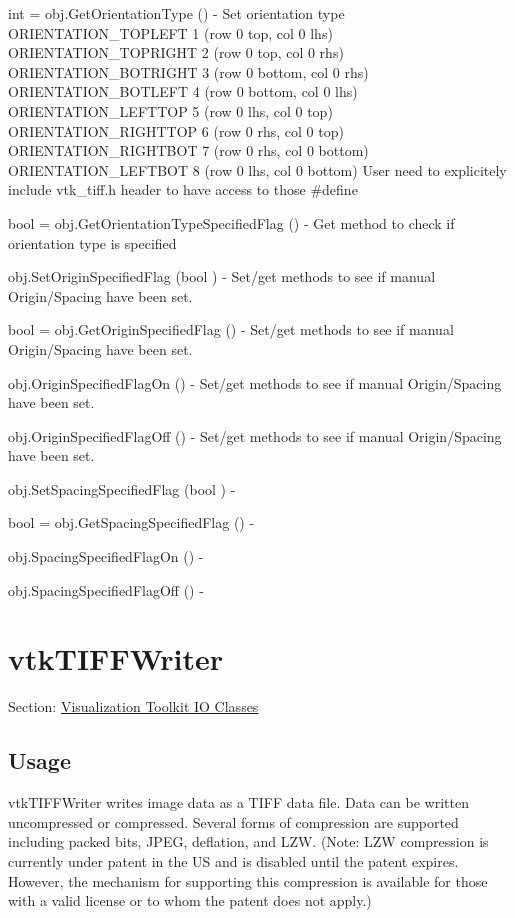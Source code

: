 \begin{DoxyItemize}
\item {\ttfamily int = obj.\-Get\-Orientation\-Type ()} -\/ Set orientation type O\-R\-I\-E\-N\-T\-A\-T\-I\-O\-N\-\_\-\-T\-O\-P\-L\-E\-F\-T 1 (row 0 top, col 0 lhs) O\-R\-I\-E\-N\-T\-A\-T\-I\-O\-N\-\_\-\-T\-O\-P\-R\-I\-G\-H\-T 2 (row 0 top, col 0 rhs) O\-R\-I\-E\-N\-T\-A\-T\-I\-O\-N\-\_\-\-B\-O\-T\-R\-I\-G\-H\-T 3 (row 0 bottom, col 0 rhs) O\-R\-I\-E\-N\-T\-A\-T\-I\-O\-N\-\_\-\-B\-O\-T\-L\-E\-F\-T 4 (row 0 bottom, col 0 lhs) O\-R\-I\-E\-N\-T\-A\-T\-I\-O\-N\-\_\-\-L\-E\-F\-T\-T\-O\-P 5 (row 0 lhs, col 0 top) O\-R\-I\-E\-N\-T\-A\-T\-I\-O\-N\-\_\-\-R\-I\-G\-H\-T\-T\-O\-P 6 (row 0 rhs, col 0 top) O\-R\-I\-E\-N\-T\-A\-T\-I\-O\-N\-\_\-\-R\-I\-G\-H\-T\-B\-O\-T 7 (row 0 rhs, col 0 bottom) O\-R\-I\-E\-N\-T\-A\-T\-I\-O\-N\-\_\-\-L\-E\-F\-T\-B\-O\-T 8 (row 0 lhs, col 0 bottom) User need to explicitely include vtk\-\_\-tiff.\-h header to have access to those \#define  
\item {\ttfamily bool = obj.\-Get\-Orientation\-Type\-Specified\-Flag ()} -\/ Get method to check if orientation type is specified  
\item {\ttfamily obj.\-Set\-Origin\-Specified\-Flag (bool )} -\/ Set/get methods to see if manual Origin/\-Spacing have been set.  
\item {\ttfamily bool = obj.\-Get\-Origin\-Specified\-Flag ()} -\/ Set/get methods to see if manual Origin/\-Spacing have been set.  
\item {\ttfamily obj.\-Origin\-Specified\-Flag\-On ()} -\/ Set/get methods to see if manual Origin/\-Spacing have been set.  
\item {\ttfamily obj.\-Origin\-Specified\-Flag\-Off ()} -\/ Set/get methods to see if manual Origin/\-Spacing have been set.  
\item {\ttfamily obj.\-Set\-Spacing\-Specified\-Flag (bool )} -\/  
\item {\ttfamily bool = obj.\-Get\-Spacing\-Specified\-Flag ()} -\/  
\item {\ttfamily obj.\-Spacing\-Specified\-Flag\-On ()} -\/  
\item {\ttfamily obj.\-Spacing\-Specified\-Flag\-Off ()} -\/  
\end{DoxyItemize}\hypertarget{vtkio_vtktiffwriter}{}\section{vtk\-T\-I\-F\-F\-Writer}\label{vtkio_vtktiffwriter}
Section\-: \hyperlink{sec_vtkio}{Visualization Toolkit I\-O Classes} \hypertarget{vtkwidgets_vtkxyplotwidget_Usage}{}\subsection{Usage}\label{vtkwidgets_vtkxyplotwidget_Usage}
vtk\-T\-I\-F\-F\-Writer writes image data as a T\-I\-F\-F data file. Data can be written uncompressed or compressed. Several forms of compression are supported including packed bits, J\-P\-E\-G, deflation, and L\-Z\-W. (Note\-: L\-Z\-W compression is currently under patent in the U\-S and is disabled until the patent expires. However, the mechanism for supporting this compression is available for those with a valid license or to whom the patent does not apply.)

